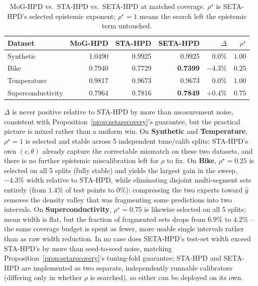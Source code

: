 \documentclass[10pt,twocolumn,a4paper]{article}
\begin{document}
\begin{table}[H]
\centering
\caption{MoG-HPD vs.\ STA-HPD vs.\ SETA-HPD at matched coverage. $\rho^\star$ is SETA-HPD's selected
epistemic exponent; $\rho^\star=1$ means the search left the epistemic term untouched.}
\label{tab:seta}
\begin{tabular}{@{}lrrrrr@{}}
\toprule
\textbf{Dataset} & \textbf{MoG-HPD} & \textbf{STA-HPD} & \textbf{SETA-HPD} & $\Delta$ & $\rho^\star$ \\
\midrule
Synthetic & 1.0490 & 0.9925 & 0.9925 & $0.0\%$ & $1.00$ \\
Bike & 0.7940 & 0.7729 & \textbf{0.7399} & $-4.3\%$ & $0.25$ \\
Temperature & 0.9817 & 0.9673 & 0.9673 & $0.0\%$ & $1.00$ \\
Superconductivity & 0.7964 & 0.7816 & \textbf{0.7849} & $+0.4\%$ & $0.75$ \\
\bottomrule
\end{tabular}
\end{table}

$\Delta$ is never positive relative to STA-HPD by more than measurement noise, consistent with
Proposition~\ref{prop:setarecovery}'s guarantee, but the practical picture is mixed rather than a
uniform win. On \textbf{Synthetic} and \textbf{Temperature}, $\rho^\star=1$ is selected and stable
across 5 independent tune/calib splits: STA-HPD's own $(c,\theta)$ already capture the correctable
mismatch on these two datasets, and there is no further epistemic miscalibration left for $\rho$ to
fix. On \textbf{Bike}, $\rho^\star=0.25$ is selected on all 5 splits (fully stable) and yields the
largest gain in the sweep, $-4.3\%$ width relative to STA-HPD, while eliminating disjoint
multi-segment sets entirely (from $1.4\%$ of test points to $0\%$): compressing the two experts
toward $\hat y$ removes the density valley that was fragmenting some predictions into two intervals.
On \textbf{Superconductivity}, $\rho^\star=0.75$ is likewise selected on all 5 splits; mean width is
flat, but the fraction of fragmented sets drops from $6.9\%$ to $4.2\%$ -- the same coverage budget
is spent as fewer, more usable single intervals rather than as raw width reduction. In no case does
SETA-HPD's test-set width exceed STA-HPD's by more than seed-to-seed noise, matching
Proposition~\ref{prop:setarecovery}'s tuning-fold guarantee; STA-HPD and SETA-HPD are implemented as
two separate, independently runnable calibrators (differing only in whether $\rho$ is searched), so
either can be deployed on its own.
\end{document}
